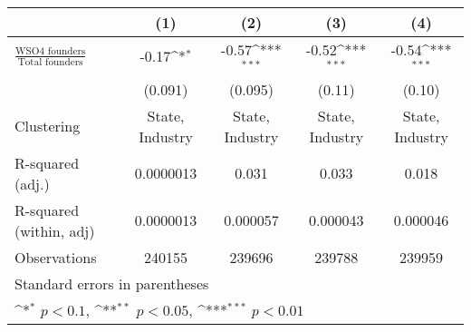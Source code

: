 {
\def\sym#1{\ifmmode^{#1}\else\(^{#1}\)\fi}
\begin{tabular}{l*{4}{c}}
\toprule
                    &\multicolumn{1}{c}{(1)}         &\multicolumn{1}{c}{(2)}         &\multicolumn{1}{c}{(3)}         &\multicolumn{1}{c}{(4)}         \\
\midrule
$\frac{\text{WSO4 founders}}{\text{Total founders}}$&       -0.17\sym{*}  &       -0.57\sym{***}&       -0.52\sym{***}&       -0.54\sym{***}\\
                    &     (0.091)         &     (0.095)         &      (0.11)         &      (0.10)         \\
\midrule
Clustering          &State, Industry         &State, Industry         &State, Industry         &State, Industry         \\
R-squared (adj.)    &   0.0000013         &       0.031         &       0.033         &       0.018         \\
R-squared (within, adj)&   0.0000013         &    0.000057         &    0.000043         &    0.000046         \\
Observations        &      240155         &      239696         &      239788         &      239959         \\
\bottomrule
\multicolumn{5}{l}{\tiny Standard errors in parentheses}\\
\multicolumn{5}{l}{\tiny \sym{*} \(p<0.1\), \sym{**} \(p<0.05\), \sym{***} \(p<0.01\)}\\
\end{tabular}
}
